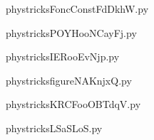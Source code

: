     \newcommand{\CaptionFigFoncConstFdDkhW}{<+Type your caption here+>}
    \begin{center}
        
    \end{center}
    phystricksFoncConstFdDkhW.py

    

    \clearpage
    


    \newcommand{\CaptionFigPOYHooNCayFj}{<+Type your caption here+>}
    \begin{center}
        
    \end{center}
    phystricksPOYHooNCayFj.py

    

    \clearpage
    


    \newcommand{\CaptionFigIERooEvNjp}{<+Type your caption here+>}
    \begin{center}
        
    \end{center}
    phystricksIERooEvNjp.py

    

    \clearpage
    


    \newcommand{\CaptionFigfigureNAKnjxQ}{<+Type your caption here+>}
    \begin{center}
        
    \end{center}
    phystricksfigureNAKnjxQ.py

    

    \clearpage
    


    \newcommand{\CaptionFigKRCFooOBTdqV}{<+Type your caption here+>}
    \begin{center}
        
    \end{center}
    phystricksKRCFooOBTdqV.py

    

    \clearpage
    


    \newcommand{\CaptionFigLSaSLoS}{<+Type your caption here+>}
    \begin{center}
        
    \end{center}
    phystricksLSaSLoS.py


